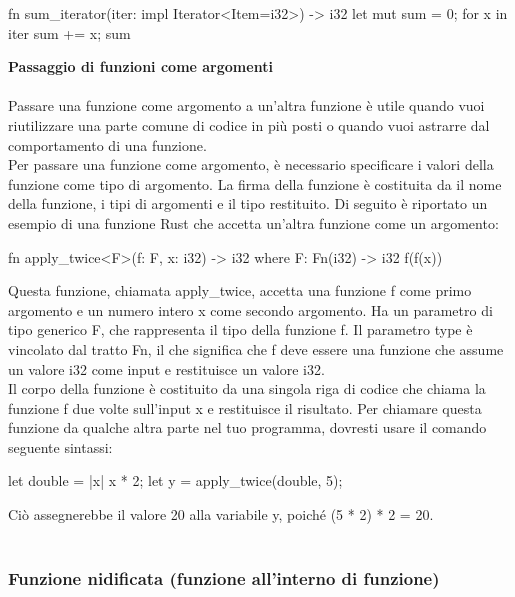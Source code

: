 \documentclass[11pt,a4paper]{article}
\begin{document}
\begin{rust}
fn sum_iterator(iter: impl Iterator<Item=i32>) -> i32 {
	let mut sum = 0;
	for x in iter {
		sum += x;
	}
	sum
}

\end{rust}


\noindent \textbf{Passaggio di funzioni come argomenti}
\\
\\
Passare una funzione come argomento a un'altra funzione è utile quando vuoi riutilizzare una parte comune di codice in più posti o quando vuoi astrarre dal comportamento di una funzione.\\
Per passare una funzione come argomento, è necessario specificare i valori della funzione come tipo di argomento. La firma della funzione è costituita da il nome della funzione, i tipi di argomenti e il tipo restituito. Di seguito è riportato un esempio di una funzione Rust che accetta un'altra funzione come un argomento:

\begin{rust}
fn apply_twice<F>(f: F, x: i32) -> i32
	where F: Fn(i32) -> i32
{
	f(f(x))
}

\end{rust}

Questa funzione, chiamata apply\_twice, accetta una funzione f come primo argomento e un numero intero x come secondo argomento. Ha un parametro di tipo generico F, che rappresenta il tipo della funzione f. Il parametro type è vincolato
dal tratto Fn, il che significa che f deve essere una funzione che assume un valore i32 come input e restituisce un valore i32.\\
Il corpo della funzione è costituito da una singola riga di codice che chiama la funzione f due volte sull'input x e restituisce il risultato. Per chiamare questa funzione da qualche altra parte nel tuo programma, dovresti usare il comando
seguente sintassi:

\begin{rust}
let double = |x| x * 2;
let y = apply_twice(double, 5);

\end{rust}
Ciò assegnerebbe il valore 20 alla variabile y, poiché (5 * 2) * 2 = 20.
\\
\\

\subsubsection{Funzione nidificata (funzione all'interno di funzione)}
\end{document}

